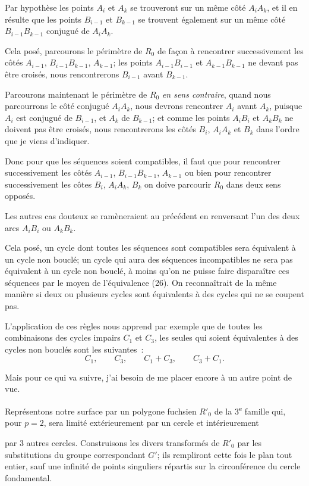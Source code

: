 \documentclass{article}
\begin{document}
Par hypothèse les points $A_{i}$ et $A_{k}$ se trouveront sur un même côté $A_{i}A_{k}$, et il en résulte que les points $B_{i-1}$ et $B_{k-1}$ se trouvent également sur un même côté $B_{i-1}B_{k-1}$ conjugué de $A_{i}A_{k}$.

Cela posé, parcourons le périmètre de $R_{0}$ de façon à rencontrer successivement les côtés $A_{i-1}$, $B_{i-1}B_{k-1}$, $A_{k-1}$; les points $A_{i-1}B_{i-1}$ et $A_{k-1}B_{k-1}$ ne devant pas être croisés, nous rencontrerons $B_{i-1}$ avant $B_{k-1}$.

Parcourons maintenant le périmètre de $R_{0}$ \emph{en sens contraire}, quand nous parcourrons le côté conjugué $A_{i}A_{k}$, nous devrons rencontrer $A_{i}$ avant $A_{k}$, puisque $A_{i}$ est conjugué de $B_{i-1}$, et $A_{k}$ de $B_{k-1}$; et comme les points $A_{i}B_{i}$ et $A_{k}B_{k}$ ne doivent pas être croisés, nous rencontrerons les côtés $B_{i}$, $A_{i}A_{k}$ et $B_{k}$ dans l'ordre que je viens d'indiquer.

Donc pour que les séquences soient compatibles, il faut que pour rencontrer successivement les côtés $A_{i-1}$, $B_{i-1}B_{k-1}$, $A_{k-1}$ ou bien pour rencontrer successivement les côtes $B_{i}$, $A_{i}A_{k}$, $B_{k}$ on doive parcourir $R_{0}$ dans deux sens opposés.

Les autres cas douteux se ramèneraient au précédent en renversant l'un des deux arcs $A_{i}B_{i}$ ou $A_{k}B_{k}$.

Cela posé, un cycle dont toutes les séquences sont compatibles sera équivalent à un cycle non bouclé; un cycle qui aura des séquences incompatibles ne sera pas équivalent à un cycle non bouclé, à moins qu'on ne puisse faire disparaître ces séquences par le moyen de l'équivalence (26). On reconnaîtrait de la même manière si deux ou plusieurs cycles sont équivalents à des cycles qui ne se coupent pas.

L'application de ces règles nous apprend par exemple que de toutes les combinaisons des cycles impairs $C_{1}$ et $C_{3}$, les seules qui soient équivalentes à des cycles non bouclés sont les suivantes~:
\[ C_{1}, \qquad C_{3}, \qquad C_{1} + C_{3}, \qquad C_{3} + C_{1}. \]

Mais pour ce qui va suivre, j'ai besoin de me placer encore à un autre point de vue.

Représentons notre surface par un polygone fuchsien $R'_{0}$ de la 3\textsuperscript{e} famille qui, pour $p = 2$, sera limité extérieurement par un cercle et intérieurement

par 3 autres cercles. Construisons les divers transformés de $R'_{0}$ par les substitutions du groupe correspondant $G'$; ils rempliront cette fois le plan tout entier, sauf une infinité de points singuliers répartis sur la circonférence du cercle fondamental.
\end{document}
